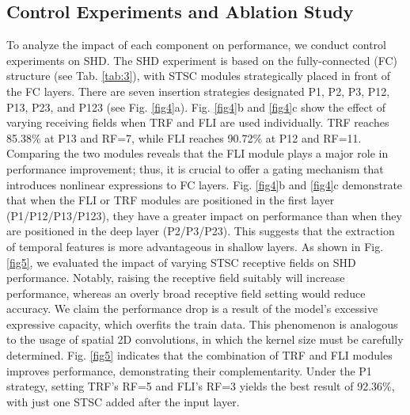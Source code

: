 \documentclass[letterpaper]{article} \usepackage[submission]{aaai23}  \usepackage{times}  \usepackage{helvet}  \usepackage{courier}  \usepackage[hyphens]{url}  \usepackage{graphicx} \urlstyle{rm} \def\UrlFont{\rm}  \usepackage{natbib}  \usepackage{caption} \frenchspacing  \setlength{\pdfpagewidth}{8.5in} \setlength{\pdfpageheight}{11in} \usepackage{algorithm}
\begin{document}
\subsection{Control Experiments and Ablation Study}
To analyze the impact of each component on performance, we conduct control experiments on SHD. The SHD experiment is based on the fully-connected (FC) structure (see Tab. \ref{tab:3}),
with STSC modules strategically placed in front of the FC layers.
There are seven insertion strategies designated P1, P2, P3, P12, P13, P23, and P123 (see Fig. \ref{fig4}a).
Fig. \ref{fig4}b and \ref{fig4}c show the effect of varying receiving fields when TRF and FLI are used individually.
TRF reaches 85.38\% at P13 and RF=7, while FLI reaches 90.72\% at P12 and RF=11. 
Comparing the two modules reveals that the FLI module plays a major role in performance improvement; thus, it is crucial to offer a gating mechanism that introduces nonlinear expressions to FC layers.
Fig. \ref{fig4}b and \ref{fig4}c demonstrate that when the FLI or TRF modules are positioned in the first layer (P1/P12/P13/P123), they have a greater impact on performance than when they are positioned in the deep layer (P2/P3/P23). This suggests that the extraction of temporal features is more advantageous in shallow layers.
As shown in Fig. \ref{fig5}, we evaluated the impact of varying STSC  receptive fields on SHD performance.
Notably, raising the receptive field suitably will increase performance, whereas an overly broad receptive field setting would reduce accuracy.
We claim the performance drop is a result of the model's excessive expressive capacity, which overfits the train data.
This phenomenon is analogous to the usage of spatial 2D convolutions, in which the kernel size must be carefully determined.
Fig. \ref{fig5} indicates that the combination of TRF and FLI modules improves performance, demonstrating their complementarity.
Under the P1 strategy, setting TRF's RF=5 and FLI's RF=3 yields the best result of 92.36\%, with just one STSC added after the input layer.
\end{document}
